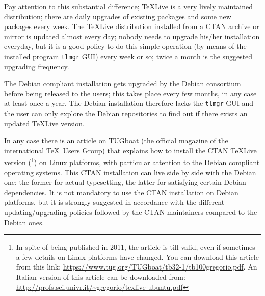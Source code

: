 Pay attention to this substantial difference; TeXLive is a very lively maintained distribution; there are daily upgrades of existing packages and some new packages every week. The TeXLive distribution installed from a CTAN archive or mirror is updated almost every day; nobody needs to upgrade his/her installation everyday, but it is a good policy to do this simple operation (by means of the installed program \texttt{tlmgr} GUI) every week or so; twice a month is the suggested upgrading frequency.

The Debian compliant installation gets upgraded by the Debian consortium before being released to the users; this takes place every few months, in any case at least once a year. The Debian installation therefore lacks the \texttt{tlmgr} GUI and the user can only explore the Debian repositories to find out if there exists an updated TeXLive version.

In any case there is an article on TUGboat (the official magazine of the international \TeX\ Users Group) that explains how to install the CTAN TeXLive version (\cite{art:GregorioTUB-ubuntu}\footnote{In spite of being published in 2011, the article is till valid, even if sometimes a few details on Linux platforms have changed. You can download this article from this link: \url{https://www.tug.org/TUGboat/tb32-1/tb100gregorio.pdf}. An Italian version of this article can be downloaded from: \url{http://profs.sci.univr.it/~gregorio/texlive-ubuntu.pdf}}) on Linux platforms, with particular attention to the Debian compliant operating systems. This CTAN installation can live side by side with the Debian one; the former for actual typesetting, the latter for satisfying certain Debian dependencies. It is not mandatory to use the CTAN installation on Debian platforms, but it is strongly suggested in accordance with the different updating\slash upgrading policies followed by the CTAN maintainers compared to the Debian ones.




